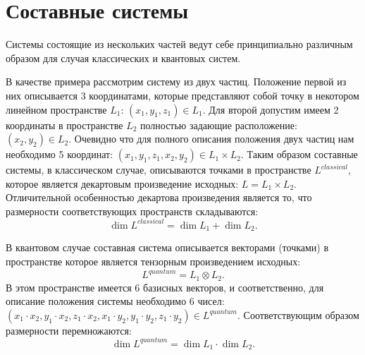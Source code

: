 \section{Составные системы}
\label{sec:add:quantum:composite}
Системы состоящие из нескольких частей ведут себе принципиально
различным образом для случая классических и квантовых систем.


В качестве примера рассмотрим систему из двух частиц. Положение первой
из них описывается 3 координатами, которые представляют собой точку в
некотором линейном пространстве $L_1$: $(x_1, y_1, z_1) \in L_1$. Для второй
допустим имеем 2 координаты в пространстве $L_2$ полностью задающие
расположение:  
$(x_2, y_2) \in L_2$. Очевидно что для полного описания положения двух
частиц нам необходимо 5 координат: $(x_1, y_1, z_1, x_2, y_2) \in L_1
\times L_2$. Таким образом составные системы, в классическом случае,
описываются точками в пространстве $L^{classical}$, которое является декартовым
произведение исходных: $L = L_1 \times L_2$. Отличительной
особенностью декартова произведения является то, что размерности
соответствующих пространств складываются:
\[
\dim{L^{classical}} = \dim{L_1} + \dim{L_2}.
\] 

В квантовом случае составная система описывается векторами (точками) в
пространстве которое является тензорным произведением исходных: 
\[
L^{quantum} = L_1 \otimes L_2.
\]
В этом пространстве имеется 6 базисных векторов, и соответственно, для
описание положения системы необходимо 6 чисел:
$(x_1 \cdot x_2, y_1 \cdot x_2, z_1 \cdot x_2, 
x_1 \cdot y_2, y_1 \cdot y_2, z_1 \cdot y_2) \in L^{quantum}$. 
Соответствующим образом размерности перемножаются:
\[
\dim{L^{quantum}} = \dim{L_1} \cdot \dim{L_2}.
\] 
